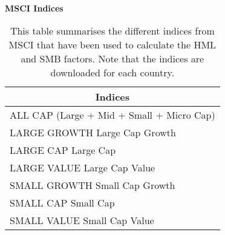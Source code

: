 \begin{table}[H]
\caption{\\ \large{\textbf{MSCI Indices}}}
\captionsetup{font = footnotesize, justification = justified, width = \linewidth}
\caption*{This table summarises the different indices from MSCI
                        that have been used to calculate the HML and SMB factors.
                        Note that the indices are downloaded for each country.}
\centering
\label{tab:msci_indices}
\begin{tabular}[t]{l}
\toprule
\multicolumn{1}{c}{\textbf{Indices}}\\
\midrule
ALL CAP (Large + Mid + Small + Micro Cap)\\
LARGE GROWTH Large Cap Growth\\
LARGE CAP Large Cap\\
LARGE VALUE Large Cap Value\\
SMALL GROWTH Small Cap Growth\\
\addlinespace
SMALL CAP Small Cap\\
SMALL VALUE Small Cap Value\\
\bottomrule
\end{tabular}
\end{table}
